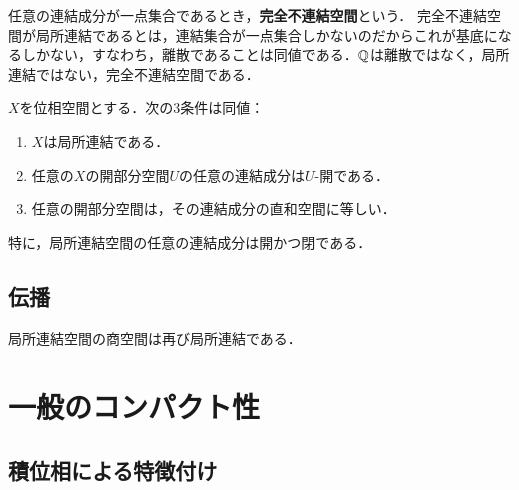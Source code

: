 \documentclass[uplatex,dvipdfmx]{jsreport}
\begin{document}
\begin{example}
    任意の連結成分が一点集合であるとき，\textbf{完全不連結空間}という．
    完全不連結空間が局所連結であるとは，連結集合が一点集合しかないのだからこれが基底になるしかない，すなわち，離散であることは同値である．$\mathbb{Q}$は離散ではなく，局所連結ではない，完全不連結空間である．
\end{example}

\begin{proposition}
    $X$を位相空間とする．次の3条件は同値：
    \begin{enumerate}
        \item $X$は局所連結である．
        \item 任意の$X$の開部分空間$U$の任意の連結成分は$U$-開である．
        \item 任意の開部分空間は，その連結成分の直和空間に等しい．
    \end{enumerate}
    特に，局所連結空間の任意の連結成分は開かつ閉である．
\end{proposition}

\subsection{伝播}

\begin{proposition}
    局所連結空間の商空間は再び局所連結である．
\end{proposition}



\section{一般のコンパクト性}

\subsection{積位相による特徴付け}
\end{document}

